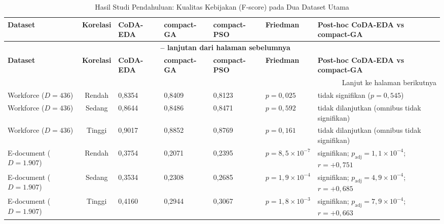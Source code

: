 \begin{longtable}{|p{2cm}|c|p{1.5cm}|p{1.5cm}|p{1.5cm}|>{\raggedright\arraybackslash}p{2cm}|>{\raggedright\arraybackslash}p{3cm}|}
\caption{Hasil Studi Pendahuluan: Kualitas Kebijakan (F-score) pada Dua Dataset Utama}
\label{tab:studi-pendahuluan-fscore} \\
\hline
\textbf{Dataset} & \textbf{Korelasi} & \textbf{CoDA-EDA} & \textbf{compact-GA} & \textbf{compact-PSO} & \textbf{Friedman} & \textbf{Post-hoc CoDA-EDA vs compact-GA} \\
\hline
\endfirsthead

\multicolumn{7}{c}{{\bfseries \tablename\ \thetable{} -- lanjutan dari halaman sebelumnya}} \\
\hline
\textbf{Dataset} & \textbf{Korelasi} & \textbf{CoDA-EDA} & \textbf{compact-GA} & \textbf{compact-PSO} & \textbf{Friedman} & \textbf{Post-hoc CoDA-EDA vs compact-GA} \\
\hline
\endhead

\hline
\multicolumn{7}{r}{Lanjut ke halaman berikutnya} \\
\endfoot

\hline
\endlastfoot

Workforce ($D=436$) & Rendah & 0{,}8354 & 0{,}8409 & 0{,}8123 & $p = 0{,}025$ & tidak signifikan ($p = 0{,}545$) \\
\hline
Workforce ($D=436$) & Sedang & 0{,}8644 & 0{,}8486 & 0{,}8471 & $p = 0{,}592$ & tidak dilanjutkan (omnibus tidak signifikan) \\
\hline
Workforce ($D=436$) & Tinggi & 0{,}9017 & 0{,}8852 & 0{,}8769 & $p = 0{,}161$ & tidak dilanjutkan (omnibus tidak signifikan) \\
\hline
E-document ($D=1.907$) & Rendah & 0{,}3754 & 0{,}2071 & 0{,}2395 & $p = 8{,}5 \times 10^{-7}$ & signifikan; $p_{\text{adj}} = 1{,}1 \times 10^{-4}$; $r = +0{,}751$ \\
\hline
E-document ($D=1.907$) & Sedang & 0{,}3534 & 0{,}2308 & 0{,}2685 & $p = 1{,}9 \times 10^{-4}$ & signifikan; $p_{\text{adj}} = 4{,}9 \times 10^{-4}$; $r = +0{,}685$ \\
\hline
E-document ($D=1.907$) & Tinggi & 0{,}4160 & 0{,}2944 & 0{,}3067 & $p = 1{,}8 \times 10^{-3}$ & signifikan; $p_{\text{adj}} = 7{,}9 \times 10^{-4}$; $r = +0{,}663$ \\
\hline

\end{longtable}

